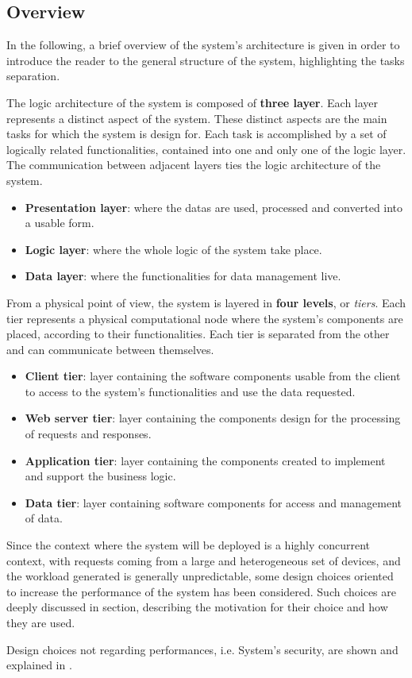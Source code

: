 \subsection{Overview}

In the following, a brief overview of the system's architecture is given in order to introduce the reader to the general structure of the system, highlighting the tasks separation.

The logic architecture of the system is composed of \textbf{three layer}. Each layer represents a distinct aspect of the system. These distinct aspects are the main tasks for which the system is design for. Each task is accomplished by a set of logically related functionalities, contained into one and only one of the logic layer. The communication between adjacent layers ties the logic architecture of the system. 

\begin{itemize}
	\item \textbf{Presentation layer}: where the datas are used, processed and converted into a usable form.
	\item \textbf{Logic layer}: where the whole logic of the system take place.
	\item \textbf{Data layer}: where the functionalities for data management live.
\end{itemize}

From a physical point of view, the system is layered in \textbf{four levels}, or \textit{tiers}. Each tier represents a physical computational node where the system's components are placed, according to their functionalities. Each tier is separated from the other and can communicate between themselves.

\begin{itemize}
	\item \textbf{Client tier}: layer containing the software components usable from the client to access to the system's functionalities and use the data requested.
	\item \textbf{Web server tier}: layer containing the components design for the processing of requests and responses.
	\item \textbf{Application tier}: layer containing the components created to implement and support the business logic.
	\item \textbf{Data tier}: layer containing software components for access and management of data.
\end{itemize}

Since the context where the system will be deployed is a highly concurrent context, with requests coming from a large and heterogeneous set of devices, and the workload generated is generally unpredictable, some design choices oriented to increase the performance of the system has been considered.
Such choices are deeply discussed in \textit{} section, describing the motivation for their choice and how they are used.

Design choices not regarding performances, i.e. System's security, are shown and explained in \textit{}.
